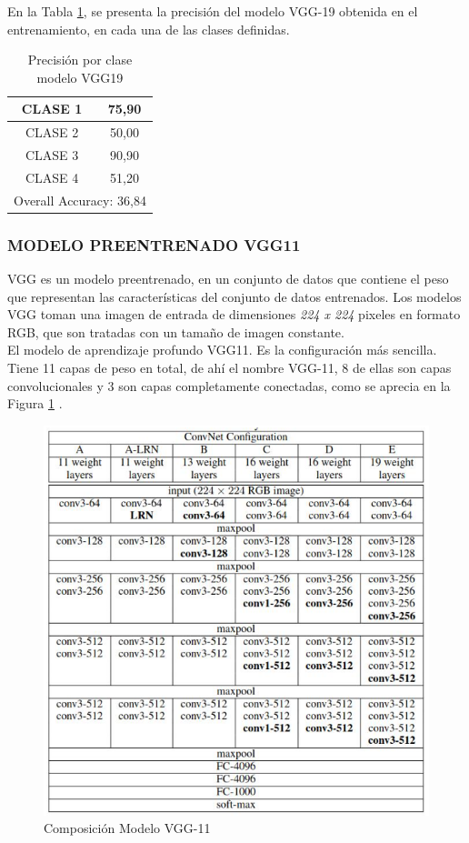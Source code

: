 En la Tabla \ref{fig:ACU_VGG19}, se presenta la precisión del modelo VGG-19 obtenida en el entrenamiento, en cada una de las clases definidas.

\begin{table}[htbp]
	\centering
	\begin{tabular}{|c|c|}
		\hline
		CLASE 1 & 75,90 \bigstrut\\
		\hline
		CLASE 2 & 50,00 \bigstrut\\
		\hline
		CLASE 3 & 90,90 \bigstrut\\
		\hline
		CLASE 4 & 51,20 \bigstrut\\
		\hline
		\multicolumn{2}{|c|}{Overall Accuracy: 36,84} \bigstrut\\
		\hline
	\end{tabular}%
	\caption{Precisión por clase modelo VGG19}
	\label{fig:ACU_VGG19}
\end{table}%


\newpage
\subsubsection{\MakeUppercase{Modelo preentrenado VGG11}}
VGG es un modelo preentrenado, en un conjunto de datos que contiene el peso que representan las características del conjunto de datos entrenados. Los modelos VGG toman una imagen de entrada de dimensiones \textit{224 x 224} pixeles en formato RGB, que son tratadas con un tamaño de imagen constante.\\


El modelo de aprendizaje profundo VGG11. Es la configuración más sencilla. Tiene 11 capas de peso en total, de ahí el nombre VGG-11, 8 de ellas son capas convolucionales y 3 son capas completamente conectadas, como se aprecia en la Figura \ref{fig:VGG11} \cite{ref_3}.

\begin{figure}[ht]
	\centering
	\includegraphics[scale=0.6]{Figs/70.png}
	\caption{Composición Modelo VGG-11}
	\label{fig:VGG11}
\end{figure}

